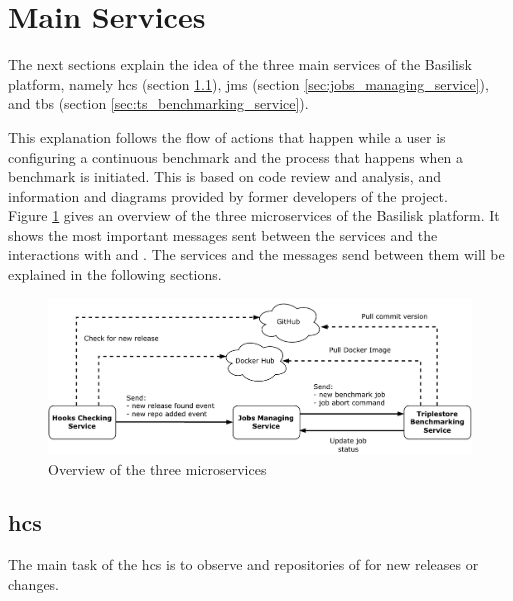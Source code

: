 \section{Main Services}
\label{sec:main_services}
The next sections explain the idea of the three main services of the Basilisk platform, namely \acf{hcs} (section \ref{sec:hooks_checking_service}), \acf{jms} (section \ref{sec:jobs_managing_service}), and \acf{tbs} (section \ref{sec:ts_benchmarking_service}).

This explanation follows the flow of actions that happen while a user is configuring a continuous benchmark and the process that happens when a benchmark is initiated. This is based on code review and analysis, and information and diagrams provided by former developers of the project.
\\

Figure \ref{fig:basilisk_high_level_design_approach} gives an overview of the three microservices of the Basilisk platform.
It shows the most important messages sent between the services and the interactions with \gh{} and \dockh{}.
The services and the messages send between them will be explained in the following sections.
\begin{figure}[tbph]
	\centering
	\includegraphics[width=1\textwidth]{figures/high-level-design-approach.pdf}
	\caption{Overview of the three microservices}
	\label{fig:basilisk_high_level_design_approach}
\end{figure}



\subsection{\acl{hcs}}
\label{sec:hooks_checking_service}
The main task of the \ac{hcs} is to observe \gh{} and \dockh{} repositories of \tsp{} for new releases or changes.

